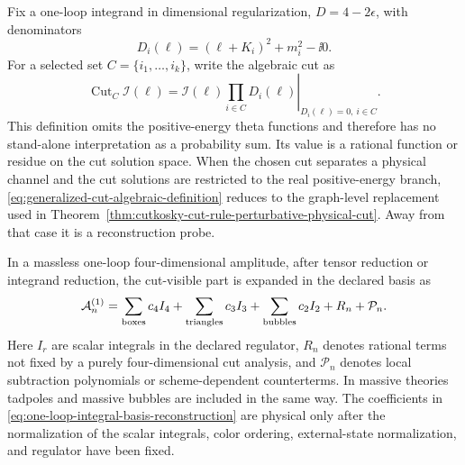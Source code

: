Fix a one-loop integrand in dimensional regularization, \(D=4-2\epsilon\),
with denominators
\[
  D_i(\ell)=(\ell+K_i)^2+m_i^2-\ii0 .
\]
For a selected set \(C=\{i_1,\ldots,i_k\}\), write the algebraic cut as
\begin{equation}
  \operatorname{Cut}_C\mathcal I(\ell)
  =
  \left.
    \mathcal I(\ell)\prod_{i\in C}D_i(\ell)
  \right|_{D_i(\ell)=0,\ i\in C}.
  \label{eq:generalized-cut-algebraic-definition}
\end{equation}
This definition omits the positive-energy theta functions and therefore has
no stand-alone interpretation as a probability sum.  Its value is a rational
function or residue on the cut solution space.  When the chosen cut separates
a physical channel and the cut solutions are restricted to the real
positive-energy branch, \eqref{eq:generalized-cut-algebraic-definition}
reduces to the graph-level replacement used in
Theorem~\ref{thm:cutkosky-cut-rule-perturbative-physical-cut}.  Away from that
case it is a reconstruction probe.

In a massless one-loop four-dimensional amplitude, after tensor reduction or
integrand reduction, the cut-visible part is expanded in the declared basis as
\begin{equation}
  \mathcal A_n^{(1)}
  =
  \sum_{\rm boxes} c_4 I_4
  +
  \sum_{\rm triangles} c_3 I_3
  +
  \sum_{\rm bubbles} c_2 I_2
  +
  R_n+\mathcal P_n .
  \label{eq:one-loop-integral-basis-reconstruction}
\end{equation}
Here \(I_r\) are scalar integrals in the declared regulator, \(R_n\) denotes
rational terms not fixed by a purely four-dimensional cut analysis, and
\(\mathcal P_n\) denotes local subtraction polynomials or scheme-dependent
counterterms.  In massive theories tadpoles and massive bubbles are included
in the same way.  The coefficients in
\eqref{eq:one-loop-integral-basis-reconstruction} are physical only after the
normalization of the scalar integrals, color ordering, external-state
normalization, and regulator have been fixed.

